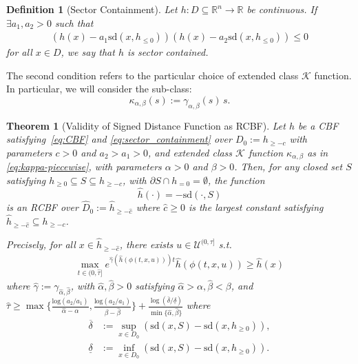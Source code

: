 \documentclass[letterpaper, 10 pt, conference]{ieeeconf}
\newtheorem{definition}{Definition}
\newtheorem{theorem}{Theorem}
\newcommand{\K}{\mathcal{K}}
\newcommand{\U}{\mathcal{U}}
\begin{document}
\begin{definition}[Sector Containment] Let $h: D\subseteq \mathbb{R}^n \rightarrow \mathbb{R}$ be continuous. If $\exists a_1, a_2 > 0$ such that
\begin{align}\label{eq:sector_containment}
    (h(x) - a_{1}\mathrm{sd}(x, h_{\leq 0}))(h(x) - a_{2}\mathrm{sd}(x, h_{\leq 0})) \leq 0
\end{align}
for all $x \in D$, we say that $h$ is sector contained.
\label{def:sector_containment}
\end{definition}

The second condition refers to the particular choice of extended class $\K$ function. In particular, we will consider the sub-class:
\begin{equation}\label{eq:kappa-piecewise}
    \kappa_{\alpha,\beta}(s):= \gamma_{\alpha,\beta}(s)\, s.
\end{equation}

\begin{theorem}[Validity of Signed Distance Function as RCBF]
Let $h$ be a CBF satisfying~\eqref{eq:CBF} and \eqref{eq:sector_containment} over $D_0:=h_{\geq -c}$ with parameters $c>0$ and $a_2>a_1>0$, and extended class $\K$ function $\kappa_{\alpha,\beta}$ as in \eqref{eq:kappa-piecewise}, with parameters $\alpha>0$ and $\beta>0$.
Then, for any closed set $S$ satisfying ${h}_{\geq 0} \subseteq S \subseteq  h_{\geq -c}$, with $\partial S\cap h_{=0}=\emptyset$, the function $$\hat{h}(\cdot) = - \mathrm{sd}(\cdot, S)$$ is an RCBF over $\hat D_0:=\hat h_{\geq -\hat c}$ where $\hat c\geq 0$ is the largest constant satisfying $\hat h_{\geq -\hat c} \subseteq h_{\geq -c}$.

Precisely, for all $x\in \hat h_{\geq-\hat c}$, there exists $u\in\U^{(0,\tau]}$ s.t.
\begin{align}
    \max\limits_{ t\in (0,\hat\tau]} 
    e^{\hat \gamma( \hat h(\phi(t,x,u)))t} \hat h(\phi(t,x,u))
    \geq \hat{h}(x)
\label{eq:validity}
\end{align}
 where $\hat\gamma:=\gamma_{\hat\alpha,\hat\beta}$, with $\hat{\alpha}, \hat{\beta} > 0$ satisfying $\hat{\alpha} > \alpha, \hat{\beta} < \beta$, and $
    \hat{\tau} \geq \max\{\frac{\mathrm{log}(a_2/a_1)}{\hat{\alpha} - \alpha}, \frac{\mathrm{log}(a_2/a_1)}{\beta - \hat{\beta}}\} + \frac{\log (\overline{\delta}/\underline{\delta})}{\min \{\hat{\alpha}, \hat{\beta}\}}$
\label{theo:Validity}
where
\begin{align*}
\overline{\delta} &:= \sup_{x \in D_0} \left(\mathrm{sd}(x,S) - \mathrm{sd}(x,h_{\geq 0})\right),\\[6pt]
\underline{\delta} &:= \inf_{x \in D_0} \left(\mathrm{sd}(x,S) - \mathrm{sd}(x,h_{\geq 0})\right).
\end{align*}
\end{theorem}
\end{document}
